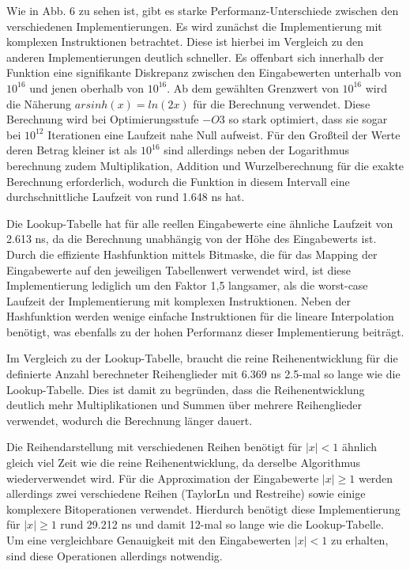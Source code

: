 \documentclass[course=erap] {aspdoc}
\begin{document}
    Wie in Abb. 6 zu sehen ist, gibt es starke Performanz-Unterschiede zwischen den verschiedenen Implementierungen.
    Es wird zunächst die Implementierung mit komplexen Instruktionen betrachtet.
    Diese ist hierbei im Vergleich zu den anderen Implementierungen deutlich schneller.
    Es offenbart sich innerhalb der Funktion eine signifikante Diskrepanz zwischen den Eingabewerten unterhalb von $10^{16}$ und jenen oberhalb von $10^{16}$.
    Ab dem gewählten Grenzwert von $10^{16}$ wird die Näherung $arsinh(x) = ln(2x)$ für die Berechnung verwendet.
    Diese Berechnung wird bei Optimierungsstufe $-O3$ so stark optimiert, dass sie sogar bei $10^{12}$ Iterationen eine Laufzeit nahe Null aufweist.
    Für den Großteil der Werte deren Betrag kleiner ist als $10^{16}$ sind allerdings neben der Logarithmus berechnung zudem Multiplikation, Addition und Wurzelberechnung für die exakte Berechnung erforderlich, wodurch die Funktion in diesem Intervall eine durchschnittliche Laufzeit von rund 1.648 ns hat.

    Die Lookup-Tabelle hat für alle reellen Eingabewerte eine ähnliche Laufzeit von 2.613 ns, da die Berechnung unabhängig von der Höhe des Eingabewerts ist.
    Durch die effiziente Hashfunktion mittels Bitmaske, die für das Mapping der Eingabewerte auf den jeweiligen Tabellenwert verwendet wird, ist diese Implementierung lediglich um den Faktor 1,5 langsamer, als die worst-case Laufzeit der Implementierung mit komplexen Instruktionen.
    Neben der Hashfunktion werden wenige einfache Instruktionen für die lineare Interpolation benötigt, was ebenfalls zu der hohen Performanz dieser Implementierung beiträgt.

    Im Vergleich zu der Lookup-Tabelle, braucht die reine Reihenentwicklung für die definierte Anzahl berechneter Reihenglieder mit 6.369 ns 2.5-mal so lange wie die Lookup-Tabelle.
    Dies ist damit zu begründen, dass die Reihenentwicklung deutlich mehr Multiplikationen und Summen über mehrere Reihenglieder verwendet, wodurch die Berechnung länger dauert.

    Die Reihendarstellung mit verschiedenen Reihen benötigt für $|x|<1$ ähnlich gleich viel Zeit wie die reine Reihenentwicklung, da derselbe Algorithmus wiederverwendet wird.
    Für die Approximation der Eingabewerte $|x|\geq1$ werden allerdings zwei verschiedene Reihen (TaylorLn und Restreihe) sowie einige komplexere Bitoperationen verwendet.
    Hierdurch benötigt diese Implementierung für $|x|\geq1$ rund 29.212 ns und damit 12-mal so lange wie die Lookup-Tabelle.
    Um eine vergleichbare Genauigkeit mit den Eingabewerten $|x|<1$ zu erhalten, sind diese Operationen allerdings notwendig.
\end{document}
